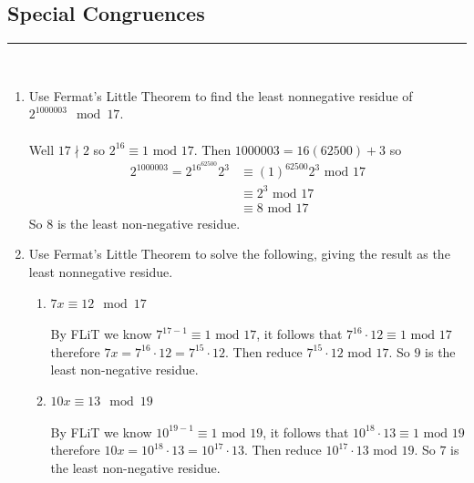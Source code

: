 \documentclass[class=article, crop=false]{standalone}
\begin{document}
\subsection{Special Congruences}
\hfill {}
\rule{\textwidth}{1pt}\\
\begin{enumerate}
\item
  Use Fermat's Little Theorem
  to find the least nonnegative residue of
  $2^{1000003}\mod 17$. \\\\
  Well $17\nmid 2$ so $2^{16} \equiv 1\mbox{ mod }17$. Then $1000003 = 16(62500) + 3$ so
  \begin{align*}
	2^{1000003}= 2^{16^{62500}} 2^3 &\equiv (1)^{62500} 2^{3} \mbox{ mod }17 \\
	&\equiv 2^3\mbox{ mod }17 \\
	&\equiv 8\mbox{ mod }17
  \end{align*}
  So $8$ is the least non-negative residue.

\item
  Use Fermat's Little Theorem to solve the following,
  giving the result as the least nonnegative residue.
  \begin{enumerate}
  \item
	$7x\equiv 12\mod 17$ \\\\
	By FLiT we know $7^{17-1} \equiv 1\mbox{ mod }17$, it follows that
	$7^{16}\cdot 12 \equiv 1\mbox{ mod }17$ therefore $7x = 7^{16}\cdot 12 = 7^{15}\cdot 12$.
	Then reduce $7^{15}\cdot 12\mbox{ mod }17$. So $9$ is the least non-negative residue.

  \item
	$10x\equiv 13\mod 19$ \\\\
	By FLiT we know $10^{19-1} \equiv 1\mbox{ mod }19$, it follows that
	$10^{18}\cdot 13 \equiv 1\mbox{ mod }19$ therefore $10x = 10^{18}\cdot 13 = 10^{17}\cdot 13$.
	Then reduce $10^{17}\cdot 13\mbox{ mod }19$. So $7$ is the least non-negative residue.

\end{enumerate}


\end{enumerate}
\end{document}
